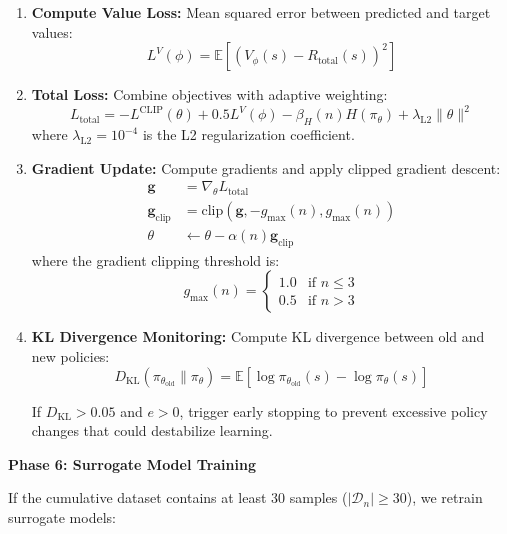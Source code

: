 \documentclass[conference]{IEEEtran}
\begin{document}
\begin{enumerate}
    \item \textbf{Compute Value Loss:} Mean squared error between predicted and target values:
    \begin{equation}
    L^V(\phi) = \mathbb{E}\left[(V_\phi(s) - R_{\text{total}}(s))^2\right]
    \end{equation}
    
    \item \textbf{Total Loss:} Combine objectives with adaptive weighting:
    \begin{equation}
    L_{\text{total}} = -L^{\text{CLIP}}(\theta) + 0.5 L^V(\phi) - \beta_H(n) H(\pi_\theta) + \lambda_{\text{L2}} \|\theta\|^2
    \end{equation}
    where $\lambda_{\text{L2}} = 10^{-4}$ is the L2 regularization coefficient.
    
    \item \textbf{Gradient Update:} Compute gradients and apply clipped gradient descent:
    \begin{align}
    \mathbf{g} &= \nabla_\theta L_{\text{total}} \\
    \mathbf{g}_{\text{clip}} &= \text{clip}(\mathbf{g}, -g_{\max}(n), g_{\max}(n)) \\
    \theta &\leftarrow \theta - \alpha(n) \mathbf{g}_{\text{clip}}
    \end{align}
    where the gradient clipping threshold is:
    \begin{equation}
    g_{\max}(n) = \begin{cases}
    1.0 & \text{if } n \leq 3 \\
    0.5 & \text{if } n > 3
    \end{cases}
    \end{equation}
    
    \item \textbf{KL Divergence Monitoring:} Compute KL divergence between old and new policies:
    \begin{equation}
    D_{\text{KL}}(\pi_{\theta_{\text{old}}} \| \pi_\theta) = \mathbb{E}\left[\log \pi_{\theta_{\text{old}}}(s) - \log \pi_\theta(s)\right]
    \end{equation}
    
    If $D_{\text{KL}} > 0.05$ and $e > 0$, trigger early stopping to prevent excessive policy changes that could destabilize learning.
\end{enumerate}

\textbf{Phase 6: Surrogate Model Training}

If the cumulative dataset contains at least 30 samples ($|\mathcal{D}_n| \geq 30$), we retrain surrogate models:
\end{document}
